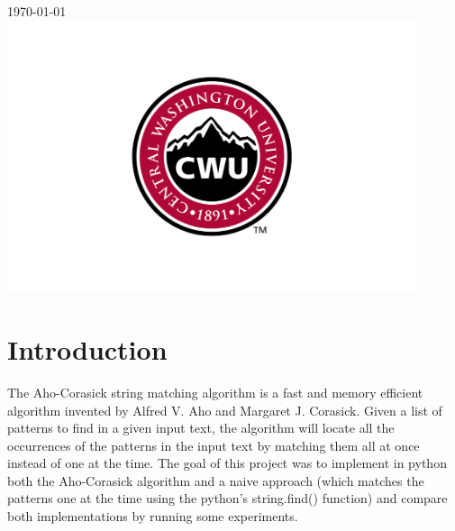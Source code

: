 \documentclass[12pt]{article}
\begin{document}
\begin{titlepage}
		
		
		{\large \today}\\ %
		
		
		\includegraphics[width=12cm]{CWU-Logo.png}\\[.5cm] %
		
		
		\vfill %
		
	\end{titlepage}
	\newpage
	\tableofcontents
	\newpage
	
	
	
	\section{Introduction}
		The Aho-Corasick string matching algorithm is a fast and memory efficient algorithm invented by Alfred V. Aho and Margaret J. Corasick. Given a list of patterns to find in a given input text, the algorithm will locate all the occurrences of the patterns in the input text by matching them all at once instead of one at the time. The goal of this project was to implement in python both the Aho-Corasick algorithm and a naive approach (which matches the patterns one at the time using the python's string.find() function) and compare both implementations by running some experiments.
	
\end{document}

